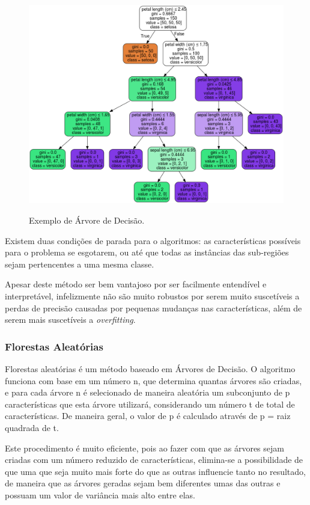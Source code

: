 \begin{figure}[h]
\caption{\small Exemplo de Árvore de Decisão.}
\centering
\includegraphics[scale=0.40]{figs/arvore-iris.png}
\label{f.arvore-iris}
\end{figure}

Existem duas condições de parada para o algoritmos: as características possíveis para o problema se esgotarem, ou até que todas as instâncias das sub-regiões sejam pertencentes a uma mesma classe. \cite{James:2014:ISL:2517747}

Apesar deste método ser bem vantajoso por ser facilmente entendível e interpretável, infelizmente não são muito robustos por serem muito suscetíveis a perdas de precisão causadas por pequenas mudanças nas características, além de serem mais suscetíveis a \textit{overfitting}. 

\subsubsection{Florestas Aleatórias}

Florestas aleatórias é um método baseado em Árvores de Decisão. O algoritmo funciona com base em um número n, que determina quantas árvores são criadas, e para cada árvore n é selecionado de maneira aleatória um subconjunto de p características que esta árvore utilizará, considerando um número t de total de características. De maneira geral, o valor de p é calculado através de p = raiz quadrada de t. \cite{James:2014:ISL:2517747}

Este procedimento é muito eficiente, pois ao fazer com que as árvores sejam criadas com um número reduzido de características, elimina-se a possibilidade de que uma que seja muito mais forte do que as outras influencie tanto no resultado, de maneira que as árvores geradas sejam bem diferentes umas das outras e possuam um valor de variância mais alto entre elas. \cite{Breiman2001} 

